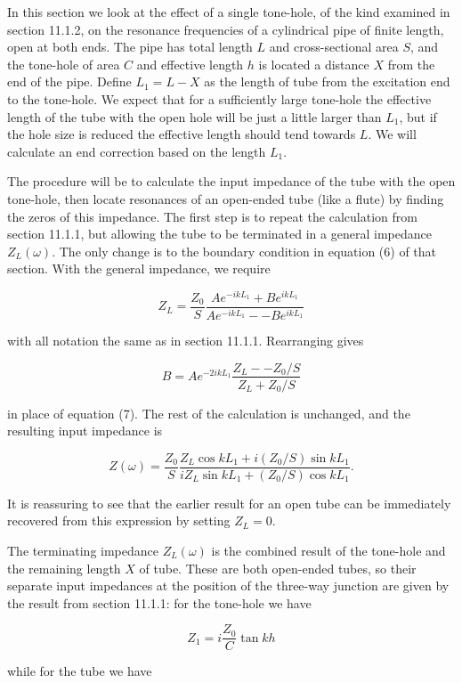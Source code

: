   In this section we look at the effect of a single tone-hole, of the kind 
  examined in section 11.1.2, on the resonance frequencies of a cylindrical 
  pipe of finite length, open at both ends. The pipe has total length $L$ and 
  cross-sectional area $S$, and the tone-hole of area $C$ and effective length 
  $h$ is located a distance $X$ from the end of the pipe. Define $L_1=L-X$ as 
  the length of tube from the excitation end to the tone-hole. We expect that 
  for a sufficiently large tone-hole the effective length of the tube with the 
  open hole will be just a little larger than $L_1$, but if the hole size is 
  reduced the effective length should tend towards $L$. We will calculate an 
  end correction based on the length $L_1$. 

  The procedure will be to calculate the input impedance of the tube with the 
  open tone-hole, then locate resonances of an open-ended tube (like a flute) 
  by finding the zeros of this impedance. The first step is to repeat the 
  calculation from section 11.1.1, but allowing the tube to be terminated in a 
  general impedance $Z_L(\omega)$. The only change is to the boundary condition 
  in equation (6) of that section. With the general impedance, we require 

  $$Z_L = \dfrac{Z_0}{S}\dfrac{Ae^{-ikL_1} + B e^{ikL_1}}{Ae^{-ikL_1} -- B 
  e^{ikL_1}} \tag{1}$$ 

  with all notation the same as in section 11.1.1. Rearranging gives 

  $$B=A e^{-2ikL_1}\dfrac{Z_L -- Z_0/S}{Z_L + Z_0/S} \tag{2}$$ 

  in place of equation (7). The rest of the calculation is unchanged, and the 
  resulting input impedance is 

  $$Z(\omega) = \dfrac{Z_0}{S}\dfrac{Z_L \cos kL_1 + i(Z_0/S) \sin kL_1}{iZ_L 
  \sin kL_1 + (Z_0/S) \cos kL_1} . \tag{3}$$ 

  It is reassuring to see that the earlier result for an open tube can be 
  immediately recovered from this expression by setting $Z_L=0$. 

  The terminating impedance $Z_L(\omega)$ is the combined result of the 
  tone-hole and the remaining length $X$ of tube. These are both open-ended 
  tubes, so their separate input impedances at the position of the three-way 
  junction are given by the result from section 11.1.1: for the tone-hole we 
  have 

  $$Z_1=i\dfrac{Z_0}{C} \tan kh \tag{4}$$ 

  while for the tube we have 

